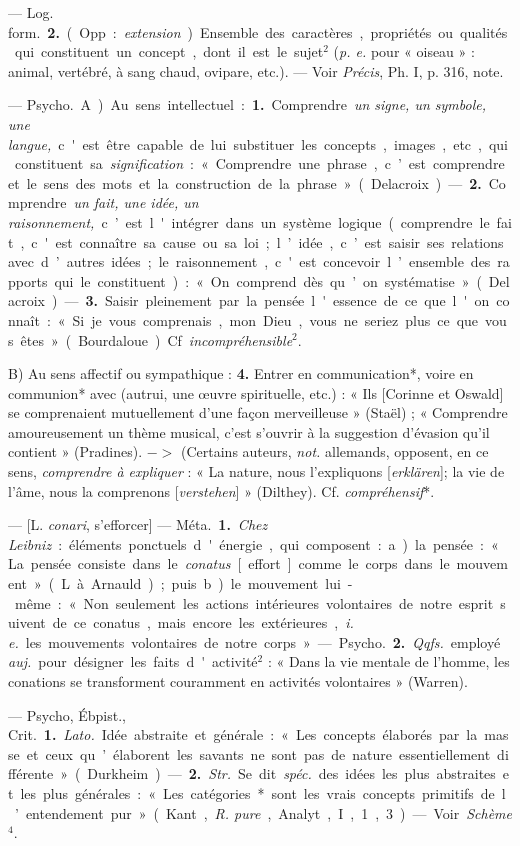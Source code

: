 \begin{itemize}[leftmargin=1cm, label=, itemsep=11pt]
— \si{Log. form.} {\bf 2.} (Opp. : {\it extension}). Ensemble des caractères, propriétés ou qualités qui constituent
un concept, dont il est le sujet$^2$
({\it p. e.} pour « oiseau » : animal, vertébré, à sang chaud, ovipare, etc.).
— Voir {\it Précis}, Ph. I, p. 316, note.

 — \si{Psycho.} A) Au sens
intellectuel : {\bf 1.} Comprendre {\it un
signe, un symbole, une langue,} c'est
être capable de lui substituer les
concepts, images, etc., qui constituent sa {\it signification} : « Comprendre
une phrase, c’est comprendre et le
sens des mots et la construction de
la phrase » (Delacroix). — {\bf 2.} Comprendre
{\it un fait, une idée, un raisonnement,} c’est l'intégrer dans un système logique (comprendre le fait,
c'est connaître sa cause ou sa loi;
l’idée, c’est saisir ses relations avec
d’autres idées; le raisonnement,
c'est concevoir l’ensemble des rapports qui le constituent) : « On comprend dès qu’on systématise » (Delacroix). — {\bf 3.} Saisir pleinement par
la pensée l'essence de ce que l'on
connaît : « Si je vous comprenais,
mon Dieu, vous ne seriez plus ce que
vous êtes » (Bourdaloue). Cf. {\it incompréhensible}$^2$.

B) Au sens affectif ou sympathique : {\bf 4.} Entrer en communication*, voire en communion* avec
(autrui, une œuvre spirituelle, etc.) :
« Ils [Corinne et Oswald] se comprenaient mutuellement d’une façon
merveilleuse » (Staël) ; « Comprendre
amoureusement un thème musical,
c'est s'ouvrir à la suggestion d'évasion qu'il contient » (Pradines).
$->$ (Certains auteurs, {\it not.} allemands, opposent, en ce sens, {\it comprendre à expliquer} : « La nature,
nous l'expliquons [{\it erklären}]; la vie
de l'âme, nous la comprenons [{\it verstehen}] » (Dilthey). Cf. {\it compréhensif}*.

 — [L. {\it conari}, s’efforcer] — \si{Méta.} {\bf 1.} {\it Chez Leibniz} : éléments ponctuels d'énergie, qui composent : a) la pensée : « La pensée
consiste dans le {\it conatus} [effort]
comme le corps dans le mouvement » (L. à Arnauld); puis b) le
mouvement lui-même : « Non seulement les actions intérieures volontaires de notre esprit suivent de ce
conatus, mais encore les extérieures,
{\it i. e.} les mouvements volontaires de
notre corps ». — \si{Psycho.} {\bf 2.} {\it Qqfs.}
employé {\it auj.} pour désigner les faits
d'activité$^2$ : « Dans la vie mentale de
l'homme, les conations se transforment
couramment en activités volontaires » (Warren).

 — \si{Psycho, Ébpist., Crit.} {\bf 1.}
 {\it Lato.} Idée abstraite et générale :
« Les concepts élaborés par la masse
et ceux qu’élaborent les savants ne
sont pas de nature essentiellement
différente » (Durkheim). — {\bf 2.}  {\it Str.}
Se dit  {\it spéc.} des idées les plus
abstraites et les plus générales :
« Les catégories* sont les vrais
concepts primitifs de l’entendement
pur» (Kant, {\it R. pure}, Analyt., I, 1, 3).
— Voir {\it Schème}$^4$.


\end{itemize}
